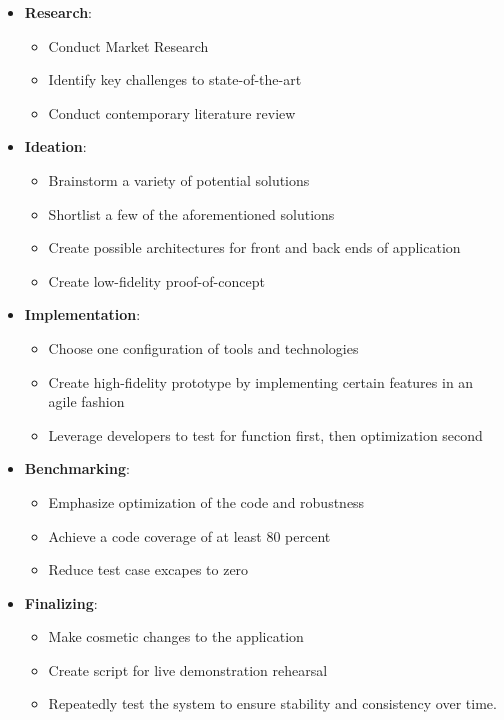 \documentclass[conference]{IEEEtran}
\begin{document}
\begin{itemize}
      \item \textbf{Research}:
            \begin{itemize}
                  \item Conduct Market Research
                  \item Identify key challenges to state-of-the-art
                  \item Conduct contemporary literature review
            \end{itemize}
      \item \textbf{Ideation}:
            \begin{itemize}
                  \item Brainstorm a variety of potential solutions
                  \item Shortlist a few of the aforementioned solutions
                  \item Create possible architectures for front and back ends of application
                  \item Create low-fidelity proof-of-concept
            \end{itemize}
      \item \textbf{Implementation}:
            \begin{itemize}
                  \item Choose one configuration of tools and technologies
                  \item Create high-fidelity prototype by implementing certain
                        features in an agile fashion
                  \item Leverage developers to test for function first,
                        then optimization second
            \end{itemize}
      \item \textbf{Benchmarking}:
            \begin{itemize}
                  \item Emphasize optimization of the code and robustness
                  \item Achieve a code coverage of at least 80 percent
                  \item Reduce test case excapes to zero
            \end{itemize}
      \item \textbf{Finalizing}:
            \begin{itemize}
                  \item Make cosmetic changes to the application
                  \item Create script for live demonstration rehearsal
                  \item Repeatedly test the system to ensure stability and consistency over time.
            \end{itemize}
\end{itemize}
\end{document}
